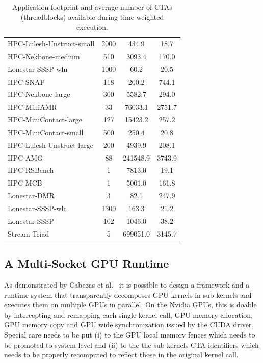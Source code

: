 \begin{table}[tp]
\begin{small}
\begin{tabular}{lccc}
HPC-Lulesh-Unstruct-small & 2000 & 434.9 & 18.7 \\
HPC-Nekbone-medium & 510 & 3093.4 & 170.0 \\
Lonestar-SSSP-wln & 1000 & 60.2 & 20.5 \\
HPC-SNAP & 118 & 200.2 & 744.1 \\
HPC-Nekbone-large & 300 & 5582.7 & 294.0 \\
HPC-MiniAMR & 33 & 76033.1 & 2751.7 \\
HPC-MiniContact-large & 127 & 15423.2 & 257.2 \\
HPC-MiniContact-small & 500 & 250.4 & 20.8 \\
HPC-Lulesh-Unstruct-large & 200 & 4939.9 & 208.1 \\
HPC-AMG & 88 & 241548.9 & 3743.9 \\
HPC-RSBench & 1 & 7813.0 & 19.1 \\
HPC-MCB & 1 & 5001.0 & 161.8 \\
Lonestar-DMR & 3 & 82.1 & 247.9 \\
Lonestar-SSSP-wlc & 1300 & 163.3 & 21.2 \\
Lonestar-SSSP & 102 & 1046.0 & 38.2 \\
Stream-Triad & 5 & 699051.0 & 3145.7 \\
\toprule
\end{tabular}
\caption{Application footprint and average number of CTAs (threadblocks) available during time-weighted execution.}
\label{tab:numctas}
\end{small}
\end{table}

\subsection{A Multi-Socket GPU Runtime}

As demonstrated by Cabezas et al.~\cite{Cabezas2015} it is possible to design 
a framework and a runtime system that transparently decomposes GPU kernels in 
sub-kernels and executes them on multiple GPUs in parallel. On the Nvidia 
GPUs, this is doable by intercepting and remapping each single kernel call, 
GPU memory allocation, GPU memory copy and GPU wide synchronization issued by 
the CUDA driver. Special care needs to be put (i) to the GPU local memory 
fences which needs to be promoted to system level and (ii) to the the 
sub-kernels CTA identifiers which needs to be properly recomputed to 
reflect those in the original kernel call. 
 
